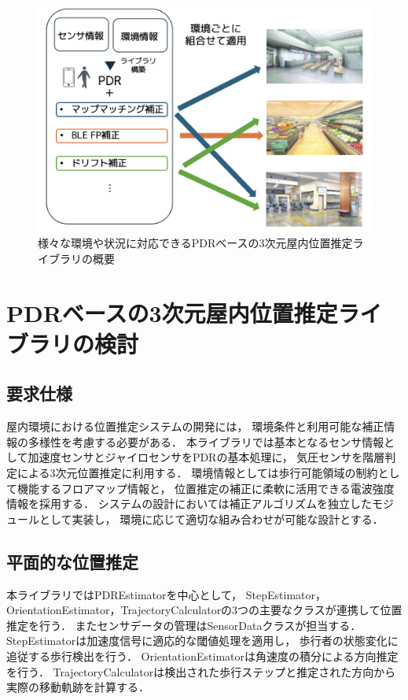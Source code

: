 \documentclass[a4paper, 10pt, twocolumn]{jarticle}
\begin{document}
\begin{figure}[h]
	\centering
	\includegraphics[width=\linewidth]{image/first.png}
	\caption{様々な環境や状況に対応できるPDRベースの3次元屋内位置推定ライブラリの概要}    \label{fig:overview}
\end{figure}


\section{PDRベースの3次元屋内位置推定ライブラリの検討}


\subsection{要求仕様}
屋内環境における位置推定システムの開発には，
環境条件と利用可能な補正情報の多様性を考慮する必要がある．
本ライブラリでは基本となるセンサ情報として加速度センサとジャイロセンサをPDRの基本処理に，
気圧センサを階層判定による3次元位置推定に利用する．
環境情報としては歩行可能領域の制約として機能するフロアマップ情報と，
位置推定の補正に柔軟に活用できる電波強度情報を採用する．
システムの設計においては補正アルゴリズムを独立したモジュールとして実装し，
環境に応じて適切な組み合わせが可能な設計とする．


\subsection{平面的な位置推定}
本ライブラリではPDREstimatorを中心として，
StepEstimator，OrientationEstimator，TrajectoryCalculatorの3つの主要なクラスが連携して位置推定を行う．
またセンサデータの管理はSensorDataクラスが担当する．
StepEstimatorは加速度信号に適応的な閾値処理を適用し，
歩行者の状態変化に追従する歩行検出を行う．
OrientationEstimatorは角速度の積分による方向推定を行う．
TrajectoryCalculatorは検出された歩行ステップと推定された方向から実際の移動軌跡を計算する．
\end{document}
